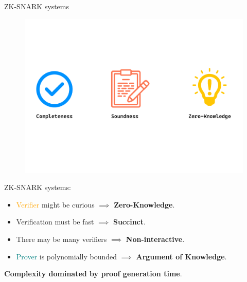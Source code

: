 \documentclass[beamer={10pt,xcolor=dvipsnames},target=mst]{thud}
\begin{document}
\begin{frame}{ZK-SNARK systems}
  \begin{figure}
    \centering
      \includegraphics[scale=0.25]{res/Zero-Knowledge-Proofs-Properties.pdf}
  \end{figure}

  ZK-SNARK systems:
  \begin{itemize}
    \item \textcolor{orange}{Verifier} might be curious \(\implies \) \textbf{Zero-Knowledge}.
    \item Verification must be fast \(\implies \) \textbf{Succinct}.
    \item There may be many verifiers  \(\implies \) \textbf{Non-interactive}.
    \item \textcolor{teal}{Prover} is polynomially bounded \(\implies \) \textbf{Argument of Knowledge}.
  \end{itemize}
  \vspace*{16pt}
  \textbf{Complexity dominated by proof generation time}.
\end{frame}
\end{document}
